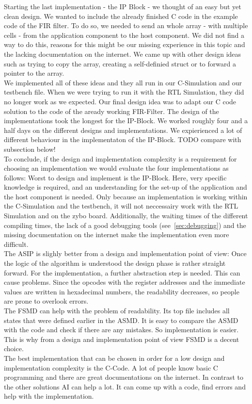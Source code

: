 \documentclass[conference]{IEEEtran}
\begin{document}
Starting the last implementation - the IP Block - we thought of an easy but yet clean design. We wanted to include the already finished C code in the example code of the FIR filter. To do so, we needed to send an whole array - with multiple cells - from the application component to the host component. We did not find a way to do this, reasons for this might be our missing experience in this topic and the lacking documentation on the internet. We came up with other design ideas such as trying to copy the array, creating a self-definied struct or to forward a pointer to the array.\\ 
We implemented all of these ideas and they all run in our C-Simulation and our testbench file. When we were trying to run it with the RTL Simulation, they did no longer work as we expected. Our final design idea was to adapt our C code solution to the code of the aready working FIR-Filter. The design of the implementations took the longest for the IP-Block. We worked roughly four and a half days on the different designs and implementations. We expierienced a lot of different behaviour in the implementaton of the IP-Block. TODO compare with subsection below!\\  
To conclude, if the design and implementation complexity is a requirement for choosing an implementation we would evaluate the four implementations as follows:
Worst to design and implement is the IP-Block. Here, very specific knowledge is required, and an understanding for the set-up of the application and the host component is needed. Only because an implementation is working within the C-Simulation and the testbench, it will not neccessairy work with the RTL Simulation and on the zybo board. Additionally, the waiting times of the different compiling times, the lack of a good debugging tools (see~\ref{sec:debugging}) and the missing documentation on the internet make the implementation even more difficult.\\
The ASIP is slighly better from a design and implementation point of view: Once the logic of the algorithm is understood the design phase is rather straight forward. For the implementation, a further abstraction step is needed. This can cause problems. Since the opcodes with the register addresses and the immediate values are written in hexadecimal numbers, the readability decreases, so people are prone to overlook errors.\\
The FSMD can help with the problem of readability. Its top file includes all states that were defined earlier in the ASMD. It is easy to compare the ASMD with the code and check if there are any mistakes. So implementation is easier. This is why from a design and implementation point of view FSMD is a decent choice.\\
The best implementation that can be chosen in order for a low design and implementation complexity is the C-Code. A lot of people know basic C programming and there are great documentations on the internet. In contrast to the other solutions AI can help a lot. It can come up with a code, find errors and help with the implementation.\\
\end{document}
